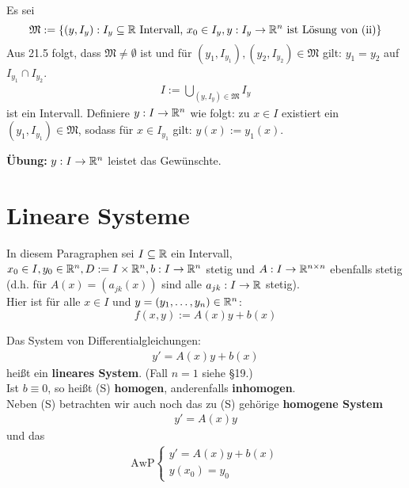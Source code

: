 \documentclass[a4paper,oneside,DIV15,BCOR12mm,chapterprefix=true,headings=onelinechapter]{scrbook}
\begin{document}
\begin{beweis}
Es sei
\[\mathfrak{M} := \{ (y,I_y) : I_y \subseteq \mathbb{R} \text{ Intervall, } 
x_0 \in I_y, y: I_y \to \mathbb{R}^n \text{ ist Lösung von (ii)} \}\]
Aus 21.5 folgt, dass $\mathfrak{M} \ne \emptyset$ ist und für 
$(y_1, I_{y_1}), (y_2, I_{y_2}) \in \mathfrak{M}$ gilt: $y_1 = y_2$ auf 
$I_{y_1} \cap I_{y_2}$.
\begin{align*}
I := \bigcup_{(y, I_y) \in \mathfrak{M}} I_y
\end{align*} 
ist ein Intervall. Definiere $y: I \to \mathbb{R}^n$ wie folgt: zu $x \in I$ existiert 
ein $(y_1, I_{y_1}) \in \mathfrak{M}$, sodass für $x \in I_{y_1}$ gilt: $y(x) := y_1(x)$.

\textbf{Übung:} $y: I \to \mathbb{R}^n$ leistet das Gewünschte.
\end{beweis}

\chapter{Lineare Systeme}
In diesem Paragraphen sei $I\subseteq\mathbb{R}$ ein Intervall, $x_0\in I, y_0\in\mathbb{R}^n,
D:=I\times\mathbb{R}^n,b:I\to\mathbb{R}^n$ stetig und $A:I\to\mathbb{R}^{n\times n}$ ebenfalls stetig 
(d.h. für $A(x)=(a_{jk}(x))$ sind alle $a_{jk}:I\to\mathbb{R}$ stetig).\\
Hier ist für alle $x\in I$ und $y=(y_1,\ldots,y_n)\in\mathbb{R}^n$:
\[f(x,y):=A(x)y+b(x)\]

\begin{definition}
Das System von Differentialgleichungen:
\begin{align*}
y'=A(x)y+b(x)\tag{S}
\end{align*}
heißt ein \textbf{lineares System}. (Fall $n=1$ siehe §19.)\\
Ist $b\equiv 0$, so heißt (S) \textbf{homogen}, anderenfalls \textbf{inhomogen}.\\
Neben (S) betrachten wir auch noch das zu (S) gehörige \textbf{homogene System}
\begin{align*}
y'=A(x)y\tag{H}
\end{align*}
und das
\begin{align*}
\text{AwP}
\tag{A}
\begin{cases}
y'=A(x)y+b(x)\\
y(x_0)=y_0
\end{cases}
\end{align*}
\end{definition}
\end{document}
